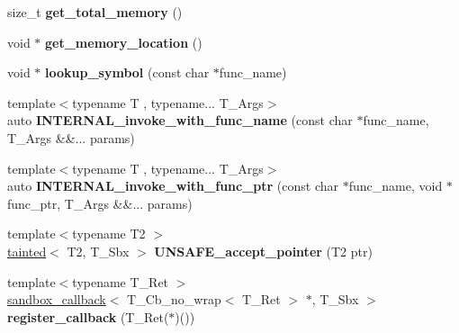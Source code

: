 \begin{DoxyCompactItemize}
\mbox{\label{classrlbox_1_1rlbox__sandbox_a9bfda00c80c73e70ddbc3f2419066cb8}} 
size\+\_\+t {\bfseries get\+\_\+total\+\_\+memory} ()
\item 
\mbox{\label{classrlbox_1_1rlbox__sandbox_af682f225ef74ad07cfa5c25e7c8ed42c}} 
void $\ast$ {\bfseries get\+\_\+memory\+\_\+location} ()
\item 
\mbox{\label{classrlbox_1_1rlbox__sandbox_a38b2f18b1db0dbd789477a93d0dc40eb}} 
void $\ast$ {\bfseries lookup\+\_\+symbol} (const char $\ast$func\+\_\+name)
\item 
\mbox{\label{classrlbox_1_1rlbox__sandbox_a9f9e13680f09205f25a520fc04ef3f9a}} 
{\footnotesize template$<$typename T , typename... T\+\_\+\+Args$>$ }\\auto {\bfseries I\+N\+T\+E\+R\+N\+A\+L\+\_\+invoke\+\_\+with\+\_\+func\+\_\+name} (const char $\ast$func\+\_\+name, T\+\_\+\+Args \&\&... params)
\item 
\mbox{\label{classrlbox_1_1rlbox__sandbox_a5eacf092a66c9d4f850b726ffdcd9926}} 
{\footnotesize template$<$typename T , typename... T\+\_\+\+Args$>$ }\\auto {\bfseries I\+N\+T\+E\+R\+N\+A\+L\+\_\+invoke\+\_\+with\+\_\+func\+\_\+ptr} (const char $\ast$func\+\_\+name, void $\ast$func\+\_\+ptr, T\+\_\+\+Args \&\&... params)
\item 
\mbox{\label{classrlbox_1_1rlbox__sandbox_acd10ff63b848c01690ba1f8977621a72}} 
{\footnotesize template$<$typename T2 $>$ }\\\hyperlink{classrlbox_1_1tainted}{tainted}$<$ T2, T\+\_\+\+Sbx $>$ {\bfseries U\+N\+S\+A\+F\+E\+\_\+accept\+\_\+pointer} (T2 ptr)
\item 
\mbox{\label{classrlbox_1_1rlbox__sandbox_ad2cf7d6b28eca1cdc04cb3cbee338189}} 
{\footnotesize template$<$typename T\+\_\+\+Ret $>$ }\\\hyperlink{classrlbox_1_1sandbox__callback}{sandbox\+\_\+callback}$<$ T\+\_\+\+Cb\+\_\+no\+\_\+wrap$<$ T\+\_\+\+Ret $>$ $\ast$, T\+\_\+\+Sbx $>$ {\bfseries register\+\_\+callback} (T\+\_\+\+Ret($\ast$)())

\end{DoxyCompactItemize}
